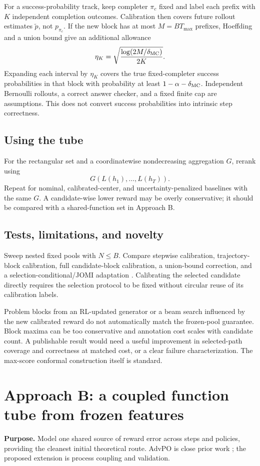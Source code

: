 For a success-probability track, keep completer $\pi_c$ fixed and label each
prefix with $K$ independent completion outcomes. Calibration then covers future
rollout estimates $\tilde p$, not $p_{\pi_c}$. If the new block has at most
$M=BT_{\max}$ prefixes, Hoeffding and a union bound give an additional allowance
\[
 \eta_K=\sqrt{\frac{\log(2M/\delta_{\rm MC})}{2K}}.
\]
Expanding each interval by $\eta_K$ covers the true fixed-completer success
probabilities in that block with probability at least
$1-\alpha-\delta_{\rm MC}$. Independent Bernoulli rollouts, a correct answer
checker, and a fixed finite cap are assumptions. This does not convert success
probabilities into intrinsic step correctness.

\subsection{Using the tube}
For the rectangular set and a coordinatewise nondecreasing aggregation $G$,
rerank using
\[
 G(L(h_1),\ldots,L(h_T)).
\]
Repeat for nominal, calibrated-center,
and uncertainty-penalized baselines with the same $G$. A candidate-wise lower
reward may be overly conservative; it should be compared with a shared-function
set in Approach B.

\subsection{Tests, limitations, and novelty}
Sweep nested fixed pools with $N\le B$. Compare stepwise calibration,
trajectory-block calibration, full candidate-block calibration, a union-bound
correction, and a selection-conditional/JOMI adaptation \cite{jomi}. Calibrating
the selected candidate directly requires the selection protocol to be fixed
without circular reuse of its calibration labels.

Problem blocks from an RL-updated generator or a beam search influenced by the
new calibrated reward do not automatically match the frozen-pool guarantee.
Block maxima can be too conservative and annotation cost scales with candidate
count. A publishable result would need a useful improvement in selected-path
coverage and correctness at matched cost, or a clear failure characterization.
The max-score conformal construction itself is standard.

\section{Approach B: a coupled function tube from frozen features}
\label{sec:approachB}
\textbf{Purpose.} Model one shared source of reward error across steps and
policies, providing the cleanest initial theoretical route. AdvPO is close prior
work \cite{advpo}; the proposed extension is process coupling and validation.

